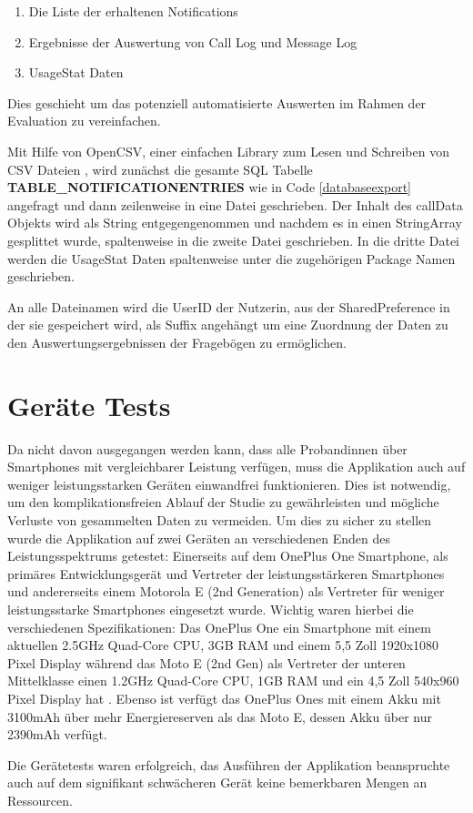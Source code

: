 \begin{enumerate}
  \item Die Liste der erhaltenen Notifications
  \item Ergebnisse der Auswertung von Call Log und Message Log
  \item UsageStat Daten
\end{enumerate}

Dies geschieht um das potenziell automatisierte Auswerten im Rahmen der Evaluation zu vereinfachen.
\par

Mit Hilfe von OpenCSV, einer einfachen Library zum Lesen und Schreiben von CSV Dateien \cite{opencsv},
wird zunächst die gesamte SQL Tabelle \textbf{TABLE\_NOTIFICATIONENTRIES} wie in Code \ref{databaseexport} angefragt und dann zeilenweise in eine Datei geschrieben.
Der Inhalt des callData Objekts wird als String entgegengenommen und nachdem es in einen StringArray gesplittet wurde, spaltenweise in die zweite Datei geschrieben.
In die dritte Datei werden die UsageStat Daten spaltenweise unter die zugehörigen Package Namen geschrieben.
\par
An alle Dateinamen wird die UserID der Nutzerin, aus der SharedPreference in der sie gespeichert wird, als Suffix angehängt um eine Zuordnung der Daten zu den Auswertungsergebnissen der Fragebögen zu ermöglichen.


\section{Geräte Tests}

Da nicht davon ausgegangen werden kann, dass alle Probandinnen über Smartphones mit vergleichbarer Leistung verfügen, muss die Applikation auch auf weniger leistungsstarken Geräten einwandfrei funktionieren.
Dies ist notwendig, um den komplikationsfreien Ablauf der Studie zu gewährleisten und mögliche Verluste von gesammelten Daten zu vermeiden.
Um dies zu sicher zu stellen wurde die Applikation auf zwei Geräten an verschiedenen Enden des Leistungsspektrums getestet:
Einerseits auf dem OnePlus One Smartphone, als primäres Entwicklungsgerät und Vertreter der leistungsstärkeren Smartphones und andererseits einem Motorola E (2nd Generation) als Vertreter für weniger leistungsstarke Smartphones eingesetzt wurde.
Wichtig waren hierbei die verschiedenen Spezifikationen:
Das OnePlus One ein Smartphone mit einem aktuellen 2.5GHz Quad-Core CPU, 3GB RAM und einem 5,5 Zoll 1920x1080 Pixel Display \cite{oneplusone}
während das Moto E (2nd Gen) als Vertreter der unteren Mittelklasse einen 1.2GHz Quad-Core CPU, 1GB RAM und ein 4,5 Zoll 540x960 Pixel Display hat \cite{motoe}.
Ebenso ist verfügt das OnePlus Ones mit einem Akku mit 3100mAh über mehr Energiereserven als das Moto E, dessen Akku über nur 2390mAh verfügt.
\par
Die Gerätetests waren erfolgreich, das Ausführen der Applikation beanspruchte auch auf dem signifikant schwächeren Gerät keine bemerkbaren Mengen an Ressourcen.



